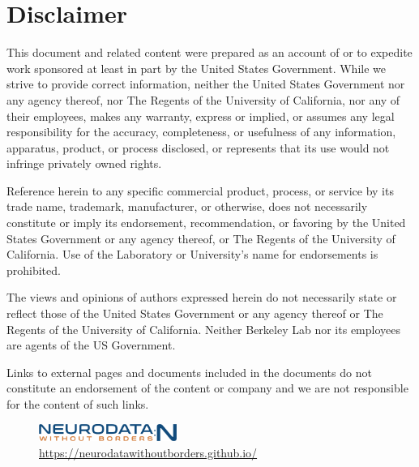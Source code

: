 \documentclass{article}
\begin{document}
\section*{Disclaimer}
\label{sec:disc}


This document and related content were prepared as an account of or to expedite 
work sponsored at least in part by the United States Government. While we strive
to provide correct information, neither the United States Government nor any 
agency thereof, nor The Regents of the University of California, nor any of their 
employees, makes any warranty, express or implied, or assumes any legal responsibility
for the accuracy, completeness, or usefulness of any information, apparatus, product,
or process disclosed, or represents that its use would not infringe privately owned rights.

Reference herein to any specific commercial product, process, or service by its 
trade name, trademark, manufacturer, or otherwise, does not necessarily constitute
or imply its endorsement, recommendation, or favoring by the United States Government
or any agency thereof, or The Regents of the University of California. Use of the 
Laboratory or University’s name for endorsements is prohibited.

The views and opinions of authors expressed herein do not necessarily state or reflect 
those of the United States Government or any agency thereof or The Regents of the 
University of California. Neither Berkeley Lab nor its employees are agents of the US Government.

Links to external pages and documents included in the documents do not constitute
an endorsement of the content or company and we are not responsible for the 
content of such links.

\begin{figure}[b!]
\vspace{1cm}
\centering
\includegraphics[width=0.4\textwidth]{nwb_n_logo.png} \\
\href{https://neurodatawithoutborders.github.io/}{https://neurodatawithoutborders.github.io/}
\end{figure}
\end{document}
